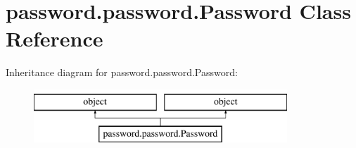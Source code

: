 \hypertarget{classpassword_1_1password_1_1Password}{\section{password.\-password.\-Password Class Reference}
\label{classpassword_1_1password_1_1Password}
}
Inheritance diagram for password.\-password.\-Password\-:\begin{figure}[H]
\begin{center}
\leavevmode
\includegraphics[height=2.000000cm]{classpassword_1_1password_1_1Password}
\end{center}
\end{figure}
